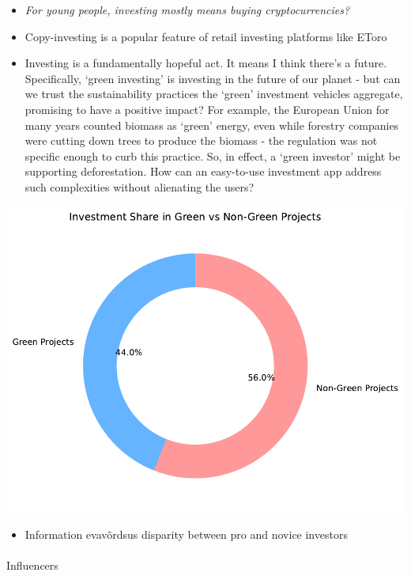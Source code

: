\documentclass[
  letterpaper,
  DIV=11,
  numbers=noendperiod]{scrartcl}
\makeatletter
\let\oldparagraph\paragraph
\renewcommand{\paragraph}{
    \@ifstar
      \xxxParagraphStar
      \xxxParagraphNoStar
  }
\newcommand{\xxxParagraphStar}[1]{\oldparagraph*{#1}\mbox{}}
\newcommand{\xxxParagraphNoStar}[1]{\oldparagraph{#1}\mbox{}}
\providecommand{\tightlist}{%
  \setlength{\itemsep}{0pt}\setlength{\parskip}{0pt}}\usepackage{longtable,booktabs,array}
\makeatother
\begin{document}
\begin{itemize}
\item
  \emph{For young people, investing mostly means buying
  cryptocurrencies?}
\item
  Copy-investing is a popular feature of retail investing platforms like
  EToro
\item
  Investing is a fundamentally hopeful act. It means I think there's a
  future. Specifically, `green investing' is investing in the future of
  our planet - but can we trust the sustainability practices the `green'
  investment vehicles aggregate, promising to have a positive impact?
  For example, the European Union for many years counted biomass as
  `green' energy, even while forestry companies were cutting down trees
  to produce the biomass - the regulation was not specific enough to
  curb this practice. So, in effect, a `green investor' might be
  supporting deforestation. How can an easy-to-use investment app
  address such complexities without alienating the users?
\end{itemize}

\includegraphics{_thesis_files/figure-pdf/cell-37-output-1.pdf}

\begin{itemize}
\tightlist
\item
  Information evavõrdsus disparity between pro and novice investors
\end{itemize}

\paragraph{Influencers}\label{influencers}
\end{document}
